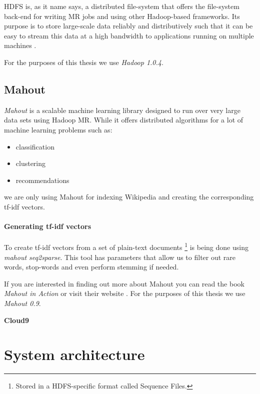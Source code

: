 \acf{HDFS} is, as it name says, a distributed file-system that offers the
file-system back-end for writing \acl{MR} jobs and using other Hadoop-based
frameworks. Its purpose is to store large-scale data reliably and
distributively such that it can be easy to stream this data at a high bandwidth
to applications running on multiple machines \cite{shvachko2010hadoop}.

For the purposes of this thesis we use \emph{Hadoop 1.0.4}.

\subsection{Mahout}

\emph{Mahout} is a scalable machine learning library designed to run over very
large data sets using Hadoop \acl{MR}. While it offers distributed algorithms
for a lot of machine learning problems such as:
\begin{itemize}
  \item classification
  \item clustering
  \item recommendations
\end{itemize}
we are only using Mahout for indexing Wikipedia and creating the corresponding
tf-idf vectors.


\paragraph{Generating tf-idf vectors} To create tf-idf vectors from a set of
plain-text documents \footnote{Stored in a \ac{HDFS}-specific format called
Sequence Files.} is being done using \emph{mahout seq2sparse}. This tool has
parameters that allow us to filter out rare words, stop-words and even perform
stemming if needed.

If you are interested in finding out more about Mahout you can read the book
\emph{Mahout in Action}  or visit their website
. For the purposes of this thesis we use
\emph{Mahout 0.9}.

\textbf{Cloud9}

\section{System architecture}


